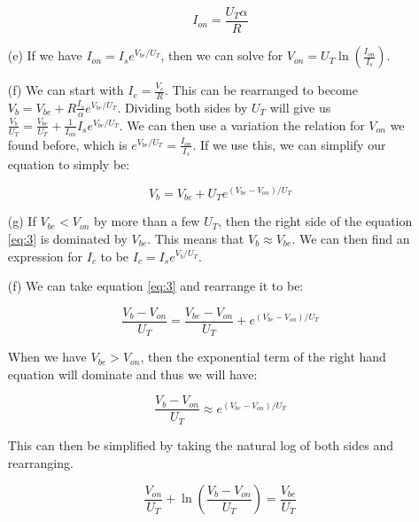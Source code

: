 \documentclass{article}
\begin{document}
\begin{itemize}
        \begin{equation} \label{eq:2}
            I_{on} = \frac{U_T \alpha}{R}
        \end{equation}

    \item[(e)]
        If we have $I_{on} = I_se^{V_{be}/U_T}$, then we can solve for $V_{on} = U_T\ln(\frac{I_{on}}{I_s})$.

    \item[(f)]
        We can start with $I_e = \frac{V_e}{R}$. This can be rearranged to become $V_b = V_{be} + R \frac{I_s}{\alpha}e^{V_{be}/U_T}$. Dividing both sides by $U_T$ will give us $\frac{V_b}{U_T} = \frac{V_{be}}{U_T} + \frac{1}{I_{on}}I_se^{V_{be}/U_T}$. We can then use a variation the relation for $V_{on}$ we found before, which is $e^{V_{be}/U_T} = \frac{I_{on}}{I_s}$. If we use this, we can simplify our equation to simply be:

        \begin{equation} \label{eq:3}
            V_b = V_{be} + U_Te^{(V_{be} - V_{on})/U_T}
        \end{equation}

    \item[(g)]
        If $V_{be} < V_{on}$ by more than a few $U_T$, then the right side of the equation \ref{eq:3} is dominated by $V_{be}$. This means that $V_b \approx V_{be}$. We can then find an expression for $I_c$ to be $I_c = I_se^{V_b/U_T}$. 

    \item[(f)]
        We can take equation \ref{eq:3} and rearrange it to be:
        
        \begin{equation*}
            \frac{V_b - V_{on}}{U_T} = \frac{V_{be} - V_{on}}{U_T} + e^{(V_{be} -V_{on})/U_T}
        \end{equation*}

        When we have $V_{be} > V_{on}$, then the exponential term of the right hand equation will dominate and thus we will have:

        \begin{equation*}
            \frac{V_b - V_{on}}{U_T} \approx e^{(V_{be} -V_{on})/U_T}
        \end{equation*}

        This can then be simplified by taking the natural log of both sides and rearranging. 

        \begin{equation*}
            \frac{ V_{on} }{ U_T } + \ln\left(\frac{V_b - V_{on}}{U_T}\right) = \frac{V_{be}}{U_T}
        \end{equation*}


\end{itemize}
\end{document}
